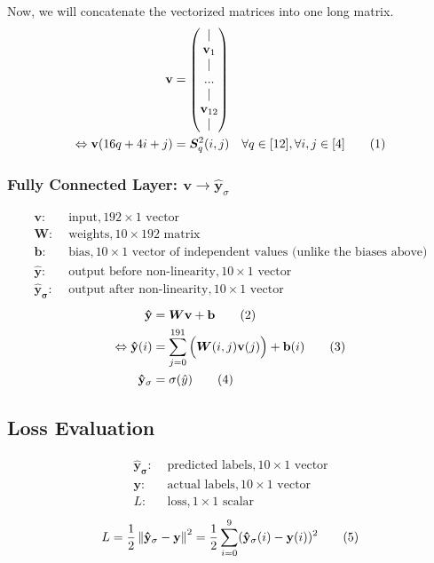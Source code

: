 \documentclass[12pt]{article}
\newcommand\norm[1]{\left\lVert#1\right\rVert}
\renewcommand{\vec}[1]{\mathbf{#1}}
\newcommand\numberthis{\stepcounter{equation}\tag{\theequation}}
\begin{document}
Now, we will concatenate the vectorized matrices into one long matrix.
\begin{align*}
    \vec{v} &= \begin{pmatrix} | \\ \vec{v}_1 \\ | \\ ... \\ | \\ \vec{v}_{12} \\ | \end{pmatrix}\\
    \Leftrightarrow \vec{v}(16q + 4i + j) &= \bm{S}^2_q(i, j) \quad \forall q \in [12], \forall i, j \in [4]
    \numberthis \label{concatenation}
\end{align*}

\subsubsection{Fully Connected Layer: $\vec{v} \rightarrow \vec{\hat{y}}_\sigma$}
\begin{align*}
    \vec{v}:& \text{ input}, 192 \times 1 \text{ vector}\\
    \bm{W}:& \text{ weights}, 10 \times 192 \text{ matrix}\\
    \vec{b}:& \text{ bias}, 10 \times 1 \text{ vector of independent values (unlike the biases above)}\\
    \vec{\hat{y}}:& \text{ output before non-linearity}, 10 \times 1 \text{ vector}\\
    \vec{\hat{y}_\sigma}:& \text{ output after non-linearity}, 10 \times 1 \text{ vector}
\end{align*}
\begin{align*}
    \vec{\hat{y}} &= \bm{W}\vec{v} + \vec{b}
    \numberthis \label{y_hat}
    \\
    \Leftrightarrow
    \vec{\hat{y}}(i) &= \sum_{j = 0}^{191}\Big(\bm{W}(i, j)\vec{v}(j)\Big) + \vec{b}(i)
    \numberthis \label{y_hat_indexbased}
    \\
    \vec{\hat{y}}_\sigma &= \sigma(\hat{y})
    \numberthis \label{y_hat_sigma}
\end{align*}

\subsection{Loss Evaluation}
\begin{align*}
    \vec{\hat{y}_\sigma}:& \text{ predicted labels}, 10 \times 1 \text{ vector}\\
    \vec{y}:& \text{ actual labels}, 10 \times 1 \text{ vector}\\
    L:& \text{ loss}, 1 \times 1 \text{ scalar}
\end{align*}
\begin{align*}
    L = \frac{1}{2} \norm{\vec{\hat{y}}_\sigma - \vec{y}}^2 =  \frac{1}{2}\sum_{i=0}^{9}(\vec{\hat{y}}_\sigma(i) - \vec{y}(i))^2
    \numberthis \label{loss}
\end{align*}
\end{document}
